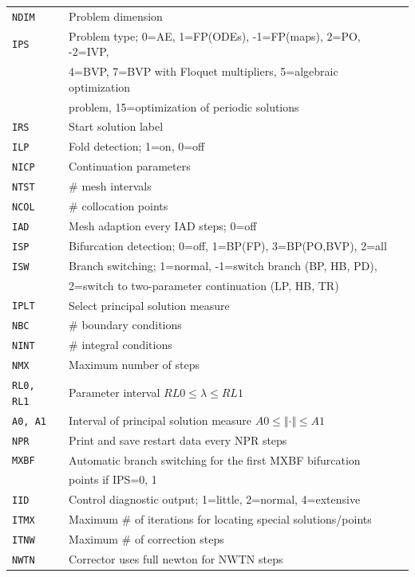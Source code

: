 \documentclass[12pt]{report}
\begin{document}
\begin{tabular}{|l|l|}
\hline
{\tt NDIM} & Problem dimension \\
{\tt IPS}  & Problem type; 0=AE, 1=FP(ODEs), -1=FP(maps), 2=PO,
           -2=IVP,\\
           & 4=BVP, 7=BVP with Floquet multipliers, 5=algebraic
           optimization \\
 	   & problem, 15=optimization of periodic solutions \\
{\tt IRS}  & Start solution label \\
{\tt ILP}  & Fold detection; 1=on, 0=off \\
\hline
{\tt NICP} & Continuation parameters \\
\hline
{\tt NTST} & \# mesh intervals \\
{\tt NCOL} & \# collocation points \\
{\tt IAD} & Mesh adaption every IAD steps; 0=off \\
{\tt ISP} & Bifurcation detection; 0=off, 1=BP(FP), 3=BP(PO,BVP), 2=all \\
{\tt ISW} & Branch switching; 1=normal, -1=switch branch (BP, HB, PD),\\
          & 2=switch to two-parameter continuation (LP, HB, TR) \\
{\tt IPLT} & Select principal solution measure \\
{\tt NBC} & \# boundary conditions \\
{\tt NINT} & \# integral conditions \\
\hline
{\tt NMX} & Maximum number of steps \\
{\tt RL0, RL1} & Parameter interval $ RL0 \leq \lambda \leq RL1$ \\
{\tt A0, A1} & Interval of principal solution measure $ A0 \leq
\Vert\cdot\Vert \leq A1$ \\
\hline
{\tt NPR} & Print and save restart data every NPR steps \\
{\tt MXBF} & Automatic branch switching for the first MXBF bifurcation \\
 	  & points if IPS=0, 1 	 \\
{\tt IID} & Control diagnostic output; 1=little, 2=normal, 4=extensive \\
{\tt ITMX} & Maximum \# of iterations for locating special solutions/points \\
{\tt ITNW} & Maximum \# of correction steps \\
{\tt NWTN} & Corrector uses full newton for NWTN steps \\

\end{tabular}
\end{document}
